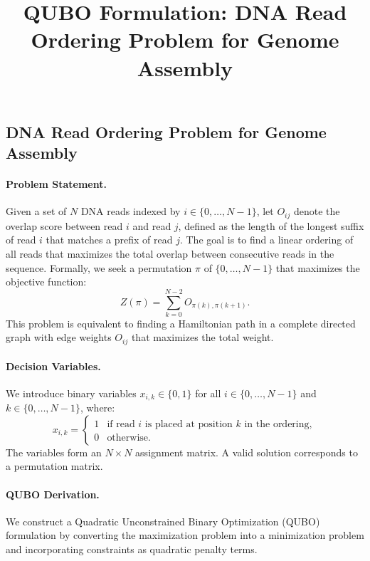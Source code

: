 \documentclass[12pt]{article}
\title{QUBO Formulation: DNA Read Ordering Problem for Genome Assembly}
\date{}
\begin{document}
\maketitle

\subsection*{DNA Read Ordering Problem for Genome Assembly}

\paragraph{Problem Statement.}
Given a set of $N$ DNA reads indexed by $i \in \{0, \dots, N-1\}$, let $O_{ij}$ denote the overlap score between read $i$ and read $j$, defined as the length of the longest suffix of read $i$ that matches a prefix of read $j$. The goal is to find a linear ordering of all reads that maximizes the total overlap between consecutive reads in the sequence. Formally, we seek a permutation $\pi$ of $\{0, \dots, N-1\}$ that maximizes the objective function:
\begin{equation}
    Z(\pi) = \sum_{k=0}^{N-2} O_{\pi(k), \pi(k+1)}.
\end{equation}
This problem is equivalent to finding a Hamiltonian path in a complete directed graph with edge weights $O_{ij}$ that maximizes the total weight.

\paragraph{Decision Variables.}
We introduce binary variables $x_{i,k} \in \{0,1\}$ for all $i \in \{0, \dots, N-1\}$ and $k \in \{0, \dots, N-1\}$, where:
\begin{equation}
    x_{i,k} = \begin{cases}
        1 & \text{if read } i \text{ is placed at position } k \text{ in the ordering}, \\
        0 & \text{otherwise}.
    \end{cases}
\end{equation}
The variables form an $N \times N$ assignment matrix. A valid solution corresponds to a permutation matrix.

\paragraph{QUBO Derivation.}
We construct a Quadratic Unconstrained Binary Optimization (QUBO) formulation by converting the maximization problem into a minimization problem and incorporating constraints as quadratic penalty terms.
\end{document}
